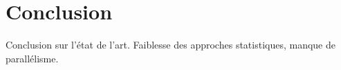 \section*{Conclusion}
\label{chap:basics:sec:conclusion}

Conclusion sur l'\'etat de l'art. Faiblesse des approches statistiques,
manque de parall\'elisme.
